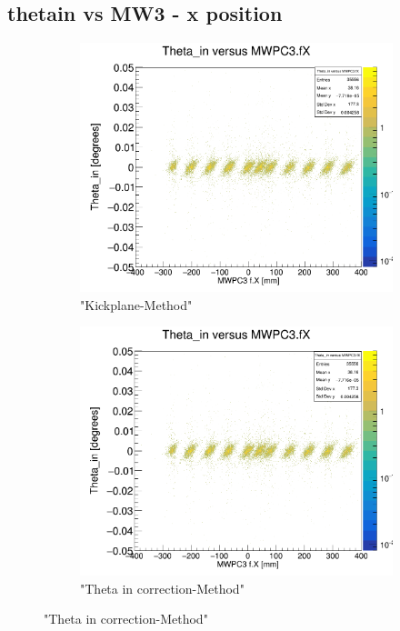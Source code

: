 \documentclass[12pt, letterpaper]{article}
\begin{document}
\subsection{theta\textunderscore in vs MW3 - x position}
\begin{figure}[!htbp]
\begin{subfigure}{.5\textwidth}
  \centering
  \includegraphics[width=.9\linewidth]{plot_imgs/theta_in_mw3_get_centr.png}  
  \caption{"Kickplane-Method"}
  \label{fig:sub-first}
\end{subfigure}
\begin{subfigure}{.5\textwidth}
  \centering
  \includegraphics[width=.9\linewidth]{plot_imgs/theta_in_mw3_corr.png} 
  \caption{"Theta \textunderscore in correction-Method"}

\end{subfigure}
\end{figure}
\end{document}
